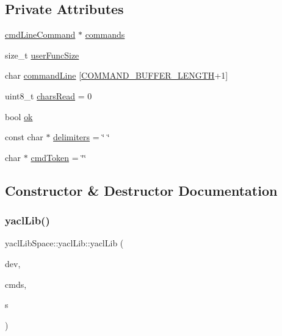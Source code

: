 \subsection*{Private Attributes}
\begin{DoxyCompactItemize}
\item 
\mbox{\hyperlink{structyacl_lib_space_1_1cmd_line_command}{cmd\+Line\+Command}} $\ast$ \mbox{\hyperlink{classyacl_lib_space_1_1yacl_lib_a346a850b37ab94f3d88a38e270fab114}{commands}}
\item 
size\+\_\+t \mbox{\hyperlink{classyacl_lib_space_1_1yacl_lib_aa8b8c329cf27a215b122388f32de866d}{user\+Func\+Size}}
\item 
char \mbox{\hyperlink{classyacl_lib_space_1_1yacl_lib_abc39ab3ac3ee31d1ad7152922e87430b}{command\+Line}} \mbox{[}\mbox{\hyperlink{namespaceyacl_lib_space_a3247d520bbfd9b82183519c563e54ef3}{C\+O\+M\+M\+A\+N\+D\+\_\+\+B\+U\+F\+F\+E\+R\+\_\+\+L\+E\+N\+G\+TH}}+1\mbox{]}
\item 
uint8\+\_\+t \mbox{\hyperlink{classyacl_lib_space_1_1yacl_lib_a6dcc9c7aa69e08e24287e56a4d8f3ce9}{chars\+Read}} = 0
\item 
bool \mbox{\hyperlink{classyacl_lib_space_1_1yacl_lib_a013bc2c8f632e7f0a272196e751b0af8}{ok}}
\item 
const char $\ast$ \mbox{\hyperlink{classyacl_lib_space_1_1yacl_lib_abf15ba80be3d08a9fa7b676c6568be68}{delimiters}} = \char`\"{} \char`\"{}
\item 
char $\ast$ \mbox{\hyperlink{classyacl_lib_space_1_1yacl_lib_a27b028d8afb6425559d37b748337af74}{cmd\+Token}} = \char`\"{}\char`\"{}
\end{DoxyCompactItemize}


\subsection{Constructor \& Destructor Documentation}
\mbox{\label{classyacl_lib_space_1_1yacl_lib_aa4d00d08ccca7681664fb834b021d4ef}} 
\subsubsection{\texorpdfstring{yaclLib()}{yaclLib()}}
{\footnotesize\ttfamily yacl\+Lib\+Space\+::yacl\+Lib\+::yacl\+Lib (\begin{DoxyParamCaption}\item[{Stream \&}]{dev,  }\item[{\mbox{\hyperlink{structyacl_lib_space_1_1cmd_line_command}{cmd\+Line\+Command}} $\ast$}]{cmds,  }\item[{size\+\_\+t}]{s }\end{DoxyParamCaption})}


